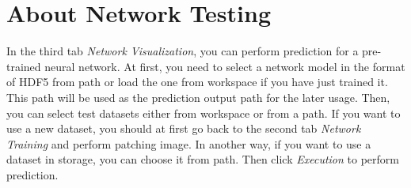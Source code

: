 \documentclass[12pt]{article}
\begin{document}
\graphicspath{ {images/} }
\section*{About Network Testing}

In the third tab \textit{Network Visualization}, you can perform prediction for a pre-trained neural network. At first, you need to select a network model in the format of HDF5 from path or load the one from workspace if you have just trained it. This path will be used as the prediction output path for the later usage. Then, you can select test datasets either from workspace or from a path. If you want to use a new dataset, you should at first go back to the second tab \textit{Network Training} and perform patching image. In another way, if you want to use a dataset in storage, you can choose it from path. Then click \textit{Execution} to perform prediction.
\end{document}
